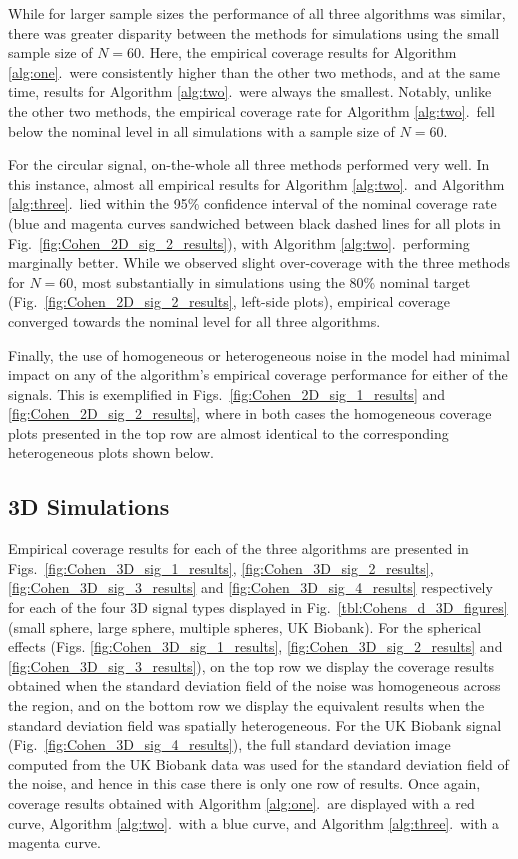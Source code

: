 \clearpage

While for larger sample sizes the performance of all three algorithms was similar, there was greater disparity between the methods for simulations using the small sample size of $N = 60$. Here, the empirical coverage results for Algorithm \ref{alg:one}.\ were consistently higher than the other two methods, and at the same time, results for Algorithm \ref{alg:two}.\ were always the smallest. Notably, unlike the other two methods, the empirical coverage rate for Algorithm \ref{alg:two}.\ fell below the nominal level in all simulations with a sample size of $N = 60$. 

For the circular signal, on-the-whole all three methods performed very well. In this instance, almost all empirical results for Algorithm \ref{alg:two}.\ and Algorithm \ref{alg:three}.\ lied within the 95\% confidence interval of the nominal coverage rate (blue and magenta curves sandwiched between black dashed lines for all plots in Fig.\ \ref{fig:Cohen_2D_sig_2_results}), with Algorithm \ref{alg:two}.\ performing marginally better. While we observed slight over-coverage with the three methods for $N = 60$, most substantially in simulations using the 80\% nominal target (Fig.\ \ref{fig:Cohen_2D_sig_2_results}, left-side plots), empirical coverage converged towards the nominal level for all three algorithms.

Finally, the use of homogeneous or heterogeneous noise in the model had minimal impact on any of the algorithm's empirical coverage performance for either of the signals. This is exemplified in Figs.\ \ref{fig:Cohen_2D_sig_1_results} and \ref{fig:Cohen_2D_sig_2_results}, where in both cases the homogeneous coverage plots presented in the top row are almost identical to the corresponding heterogeneous plots shown below. 

\subsection{3D Simulations} 
\label{sec:3d_sim_results}
Empirical coverage results for each of the three algorithms are presented in Figs.\ \ref{fig:Cohen_3D_sig_1_results}, \ref{fig:Cohen_3D_sig_2_results}, \ref{fig:Cohen_3D_sig_3_results} and \ref{fig:Cohen_3D_sig_4_results} respectively for each of the four 3D signal types displayed in Fig.\ \ref{tbl:Cohens_d_3D_figures} (small sphere, large sphere, multiple spheres, UK Biobank). For the spherical effects (Figs. \ref{fig:Cohen_3D_sig_1_results}, \ref{fig:Cohen_3D_sig_2_results} and \ref{fig:Cohen_3D_sig_3_results}), on the top row we display the coverage results obtained when the standard deviation field of the noise was homogeneous across the region, and on the bottom row we display the equivalent results when the standard deviation field was spatially heterogeneous. For the UK Biobank signal (Fig.\ \ref{fig:Cohen_3D_sig_4_results}), the full standard deviation image computed from the UK Biobank data was used for the standard deviation field of the noise, and hence in this case there is only one row of results. Once again, coverage results obtained with Algorithm \ref{alg:one}.\ are displayed with a red curve, Algorithm \ref{alg:two}.\ with a blue curve, and Algorithm \ref{alg:three}.\ with a magenta curve.

